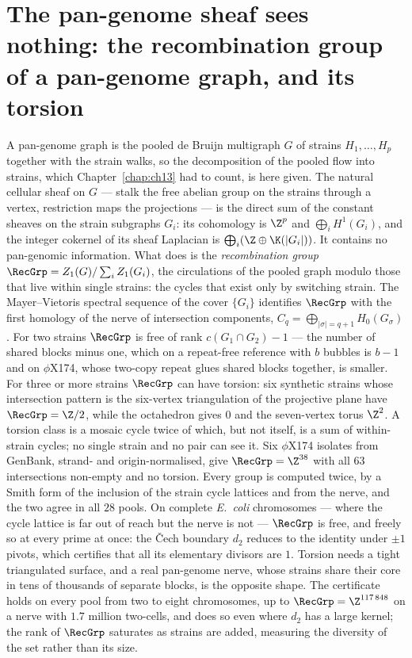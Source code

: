 \chapter[The recombination group of a pan-genome]{The pan-genome sheaf sees nothing: the recombination group of a pan-genome graph, and its torsion}\label{chap:ch14}
\begin{chaptersummary}
A pan-genome graph is the pooled de Bruijn multigraph $G$ of strains $H_1,\dots,H_p$ together
with the strain walks, so the decomposition of the pooled flow into strains, which
Chapter~\ref{chap:ch13} had to count, is here given. The natural cellular sheaf on $G$ --- stalk the
free abelian group on the strains through a vertex, restriction maps the projections --- is
the direct sum of the constant sheaves on the strain subgraphs $G_i$: its cohomology is
$\Z^p$ and $\bigoplus_i H^1(G_i)$, and the integer cokernel of its sheaf Laplacian is
$\bigoplus_i(\Z\oplus\K(|G_i|))$. It contains no pan-genomic information. What does is the
\emph{recombination group} $\RecGrp=Z_1(G)/\sum_iZ_1(G_i)$, the circulations of the pooled
graph modulo those that live within single strains: the cycles that exist only by switching
strain. The Mayer--Vietoris spectral sequence of the cover $\{G_i\}$ identifies $\RecGrp$ with the
first homology of the nerve of intersection components, $C_q=\bigoplus_{|\sigma|=q+1}
H_0(G_\sigma)$. For two strains $\RecGrp$ is free of rank $c(G_1\cap G_2)-1$ --- the number of
shared blocks minus one, which on a repeat-free reference with $b$ bubbles is $b-1$ and on
$\phi$X174, whose two-copy repeat glues shared blocks together, is smaller. For three or more
strains $\RecGrp$ can have torsion: six synthetic strains whose intersection pattern is the
six-vertex triangulation of the projective plane have $\RecGrp=\Z/2$, while the octahedron gives
$0$ and the seven-vertex torus $\Z^2$. A torsion class is a mosaic cycle twice of which, but
not itself, is a sum of within-strain cycles; no single strain and no pair can see it. Six
$\phi$X174 isolates from GenBank, strand- and origin-normalised, give $\RecGrp=\Z^{38}$ with all
$63$ intersections non-empty and no torsion. Every group is computed twice, by a Smith form of
the inclusion of the strain cycle lattices and from the nerve, and the two agree in all $28$
pools. On complete \emph{E.\ coli} chromosomes --- where the cycle lattice is far out of
reach but the nerve is not --- $\RecGrp$ is free, and freely so at every prime at once: the
\v Cech boundary $d_2$ reduces to the identity under $\pm1$ pivots, which certifies that all
its elementary divisors are $1$. Torsion needs a tight triangulated surface, and a real
pan-genome nerve, whose strains share their core in tens of thousands of separate blocks, is
the opposite shape. The certificate holds on every pool from two to eight chromosomes, up to
$\RecGrp=\Z^{117\,848}$ on a nerve with $1.7$ million two-cells, and does so even where $d_2$ has
a large kernel; the rank of $\RecGrp$ saturates as strains are added, measuring the diversity of
the set rather than its size.
\end{chaptersummary}

